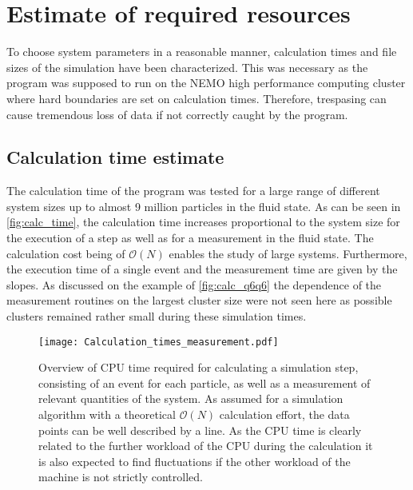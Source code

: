 \section{Estimate of required resources}
\label{sec:resources}
To choose system parameters in a reasonable manner, calculation times and file sizes of the simulation have been characterized. This was necessary as the program was supposed to run on the NEMO high performance computing cluster where hard boundaries are set on calculation times. Therefore, trespasing can cause tremendous loss of data if not correctly caught by the program.
 
\subsection{Calculation time estimate}
\label{sec:calc_times}
The calculation time of the program was tested for a large range of different system sizes up to almost 9 million particles in the fluid state. As can be seen in \autoref{fig:calc_time}, the calculation time increases proportional to the system size for the execution of a step as well as for a measurement in the fluid state. The calculation cost being of $\mathcal{O}(N)$ enables the study of large systems. Furthermore, the execution time of a single event and the measurement time are given by the slopes. As discussed on the example of \autoref{fig:calc_q6q6} the dependence of the measurement routines on the largest cluster size were not seen here as possible clusters remained rather small during these simulation times.\\

\begin{figure}[h!]
\centering
\texttt{[image: Calculation\_times\_measurement.pdf]}
\caption[Calculation time estimate of the simulation]{Overview of CPU time required for calculating a simulation step, consisting of an event for each particle, as well as a measurement of relevant quantities of the system. As assumed for a simulation algorithm with a theoretical $\mathcal{O}(N)$ calculation effort, the data points can be well described by a line. As the CPU time is clearly related to the further workload of the CPU during the calculation it is also expected to find fluctuations if the other workload of the machine is not strictly controlled.}
\label{fig:calc_time}
\end{figure}

